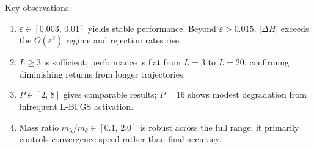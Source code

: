 \documentclass[11pt]{article}
\theoremstyle{definition}
\begin{document}
Key observations:
\begin{enumerate}[leftmargin=*]
  \item $\varepsilon\in[0.003,\,0.01]$ yields stable performance.
        Beyond $\varepsilon>0.015$, $|\Delta H|$ exceeds the
        $O(\varepsilon^2)$ regime and rejection rates rise.

  \item $L\ge3$ is sufficient; performance is flat from $L=3$ to
        $L=20$, confirming diminishing returns from longer
        trajectories.

  \item $P\in[2,\,8]$ gives comparable results; $P=16$ shows modest
        degradation from infrequent L-BFGS activation.

  \item Mass ratio $m_\lambda/m_\theta\in[0.1,\,2.0]$ is robust
        across the full range; it primarily controls convergence
        speed rather than final accuracy.
\end{enumerate}

\end{document}
